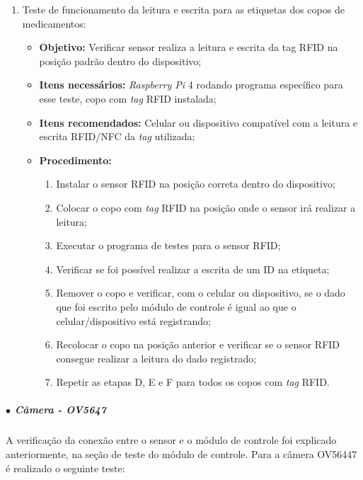 \begin{enumerate}
    \item Teste de funcionamento da leitura e escrita para as etiquetas dos copos de medicamentos:
    
    \begin{itemize}
        \item \textbf{Objetivo:} Verificar sensor realiza a leitura e escrita da tag RFID na posição padrão dentro do dispositivo;
        \item \textbf{Itens necessários:} \textit{Raspberry Pi} 4 rodando programa específico para esse teste, copo com \textit{tag} RFID instalada;
        \item \textbf{Itens recomendados:} Celular ou dispositivo compatível com a leitura e escrita RFID/NFC da \textit{tag} utilizada;
        \item \textbf{Procedimento:} 
        \begin{enumerate}
            \item Instalar o sensor RFID na posição correta dentro do dispositivo;
            \item Colocar o copo com \textit{tag} RFID na posição onde o sensor irá realizar a leitura;
            \item Executar o programa de testes para o sensor RFID;
            \item Verificar se foi possível realizar a escrita de um ID na etiqueta;
            \item Remover o copo e verificar, com o celular ou dispositivo, se o dado que foi escrito pelo módulo de controle é igual ao que o celular/dispositivo está registrando;
            \item Recolocar o copo na posição anterior e verificar se o sensor RFID consegue realizar a leitura do dado registrado;
            \item Repetir as etapas D, E e F para todos os copos com \textit{tag} RFID.
        \end{enumerate}
    \end{itemize}
\end{enumerate}

\subparagraph*{$\bullet$ Câmera - OV5647} \hfill

A verificação da conexão entre o sensor e o módulo de controle foi explicado anteriormente, na seção de teste do módulo de controle. Para a câmera OV56447 é realizado o seguinte teste:

